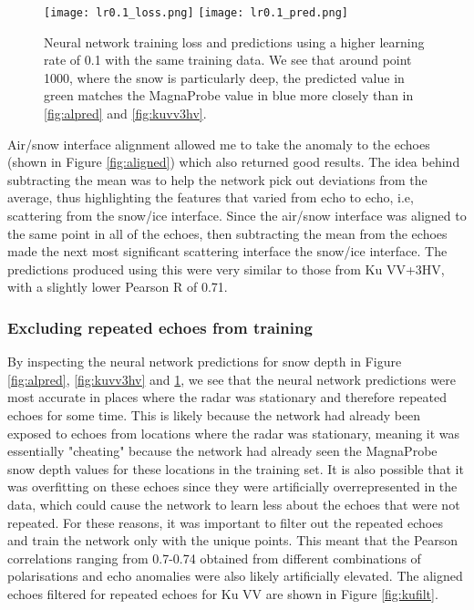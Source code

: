 \documentclass[11pt, a4paper]{article}
\begin{document}
\begin{figure}[H]
\centering
   		 \texttt{[image: lr0.1\_loss.png]}
   		 \texttt{[image: lr0.1\_pred.png]}
    		\caption{Neural network training loss and predictions using a higher learning rate of 0.1 with the same training data. We see that around point 1000, where the snow is particularly deep, the predicted value in green matches the MagnaProbe value in blue more closely than in \ref{fig:alpred} and \ref{fig:kuvv3hv}.}
	\label{fig:lr0.1}
\end{figure}
\pagebreak
Air/snow interface alignment allowed me to take the anomaly to the echoes (shown in Figure \ref{fig:aligned}) which also returned good results.  The idea behind subtracting the mean was to help the network pick out deviations from the average,  thus highlighting the features that varied from echo to echo,  i.e,  scattering from the snow/ice interface.  Since the air/snow interface was aligned to the same point in all of the echoes,  then subtracting the mean from the echoes made the next most significant scattering interface the snow/ice interface. The predictions produced using this were very similar to those from Ku VV+3HV, with a slightly lower Pearson R of 0.71.

\subsubsection{Excluding repeated echoes from training}

By inspecting the neural network predictions for snow depth in Figure \ref{fig:alpred}, \ref{fig:kuvv3hv} and \ref{fig:lr0.1}, we see that the neural network predictions were most accurate in places where the radar was stationary and therefore repeated echoes for some time.  This is likely because the network had already been exposed to echoes from locations where the radar was stationary, meaning it was essentially "cheating" because the network had already seen the MagnaProbe snow depth values for these locations in the training set.  It is also possible that it was overfitting on these echoes since they were artificially overrepresented in the data,  which could cause the network to learn less about the echoes that were not repeated.  For these reasons, it was important to filter out the repeated echoes and train the network only with the unique points. This meant that the Pearson correlations ranging from 0.7-0.74 obtained from different combinations of polarisations and echo anomalies were also likely artificially elevated. The aligned echoes filtered for repeated echoes for Ku VV are shown in Figure \ref{fig:kufilt}. 
\end{document}
